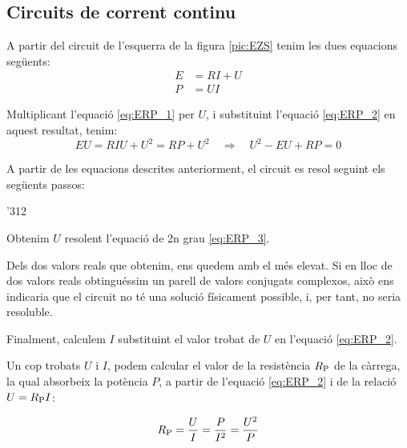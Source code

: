 \begin{center}
   
     \label{pic:EZS}
\end{center}

\subsection{Circuits de corrent continu}

A partir del circuit de l'esquerra de la figura \vref{pic:EZS} tenim les dues equacions següents:
\begin{align}
   E &= R I + U \label{eq:ERP_1} \\
   P &= U I     \label{eq:ERP_2}
\end{align}

Multiplicant l'equació \eqref{eq:ERP_1} per $U$, i substituint l'equació \eqref{eq:ERP_2} en aquest resultat, tenim:
\begin{equation}
   E U = R I U + U^2 = R P + U^2 \quad \Rightarrow \quad U^2 - E U + R P = 0 \label{eq:ERP_3}
\end{equation}

A partir de les equacions descrites anteriorment, el circuit es resol seguint els següents passos:
\begin{dingautolist}{'312}
   \item Obtenim $U$ resolent l'equació de 2n grau \eqref{eq:ERP_3}.
   \item Dels dos valors reals que obtenim, ens quedem amb el més elevat. Si en lloc de dos valors reals obtinguéssim
   un parell de valors conjugats complexos, això ens indicaria que el circuit no té una solució físicament possible, i, per tant, no seria resoluble.
   \item Finalment, calculem $I$ substituint el valor trobat de $U$ en l'equació \eqref{eq:ERP_2}.
\end{dingautolist}

Un cop trobats $U$ i $I$, podem calcular el valor de la resistència
$R_\mathrm{P}$ de la càrrega, la qual absorbeix la potència $P$, a
partir de l'equació \eqref{eq:ERP_2} i de la relació $U =R_\mathrm{P}
I$:

\begin{equation}
   R_\mathrm{P} = \frac{U}{I} = \frac{P}{I^2} = \frac{U^2}{P}
\end{equation}

